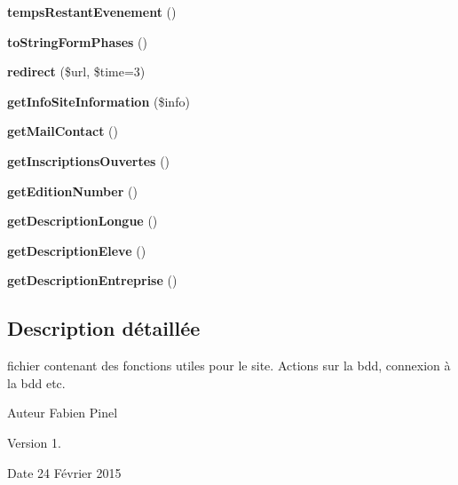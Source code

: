 \begin{DoxyCompactItemize}
\item 
\hypertarget{function_8php_aab960eb2647ea0acdae908f5e266f0b7}{{\bfseries temps\-Restant\-Evenement} ()}\label{function_8php_aab960eb2647ea0acdae908f5e266f0b7}

\item 
\hypertarget{function_8php_a41cb5b8c5f9c311e60a9c1fda868b400}{{\bfseries to\-String\-Form\-Phases} ()}\label{function_8php_a41cb5b8c5f9c311e60a9c1fda868b400}

\item 
\hypertarget{function_8php_a05f4bb6d10cc6111be0ac7ef6d64afe2}{{\bfseries redirect} (\$url, \$time=3)}\label{function_8php_a05f4bb6d10cc6111be0ac7ef6d64afe2}

\item 
\hypertarget{function_8php_ae794d06da96bc5584fea22c6cf17e6b1}{{\bfseries get\-Info\-Site\-Information} (\$info)}\label{function_8php_ae794d06da96bc5584fea22c6cf17e6b1}

\item 
\hypertarget{function_8php_aeaa7663b14ca5424bead755e3dc3ad3e}{{\bfseries get\-Mail\-Contact} ()}\label{function_8php_aeaa7663b14ca5424bead755e3dc3ad3e}

\item 
\hypertarget{function_8php_a232dc7b3702c6020351ad2a6d4709440}{{\bfseries get\-Inscriptions\-Ouvertes} ()}\label{function_8php_a232dc7b3702c6020351ad2a6d4709440}

\item 
\hypertarget{function_8php_a6afecdb008ec400eb6ea7e81b390e75a}{{\bfseries get\-Edition\-Number} ()}\label{function_8php_a6afecdb008ec400eb6ea7e81b390e75a}

\item 
\hypertarget{function_8php_a2b58a58c58d378d8e5e45a8a4975a9c6}{{\bfseries get\-Description\-Longue} ()}\label{function_8php_a2b58a58c58d378d8e5e45a8a4975a9c6}

\item 
\hypertarget{function_8php_a14c27ac7d6919e63feeb208b23fb8e0f}{{\bfseries get\-Description\-Eleve} ()}\label{function_8php_a14c27ac7d6919e63feeb208b23fb8e0f}

\item 
\hypertarget{function_8php_a456229c528a5651cdb5a0c9b7c7207a7}{{\bfseries get\-Description\-Entreprise} ()}\label{function_8php_a456229c528a5651cdb5a0c9b7c7207a7}

\end{DoxyCompactItemize}


\subsection{Description détaillée}
fichier contenant des fonctions utiles pour le site. Actions sur la bdd, connexion à la bdd etc. \begin{DoxyAuthor}{Auteur}
Fabien Pinel 
\end{DoxyAuthor}
\begin{DoxyVersion}{Version}
1. 
\end{DoxyVersion}
\begin{DoxyDate}{Date}
24 Février 2015 
\end{DoxyDate}
